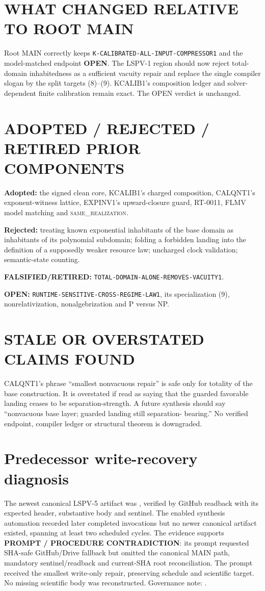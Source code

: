 \documentclass[11pt]{article}
\newcommand{\OPEN}{\textbf{OPEN}}
\newcommand{\same}{\textsc{same\_realization}}
\begin{document}
\section{WHAT CHANGED RELATIVE TO ROOT MAIN}
Root MAIN correctly keeps \texttt{K-CALIBRATED-ALL-INPUT-COMPRESSOR1} and
the model-matched endpoint \OPEN.  The LSPV-1 region should now reject
total-domain inhabitedness as a sufficient vacuity repair and replace the
single compiler slogan by the split targets (8)--(9).  KCALIB1's composition
ledger and solver-dependent finite calibration remain exact.  The OPEN
verdict is unchanged.

\section{ADOPTED / REJECTED / RETIRED PRIOR COMPONENTS}
\textbf{Adopted:} the signed clean core, KCALIB1's charged composition,
CALQNT1's exponent-witness lattice, EXPINV1's upward-closure guard, RT-0011,
FLMV model matching and \same{}.

\textbf{Rejected:} treating known exponential inhabitants of the base domain
as inhabitants of its polynomial subdomain; folding a forbidden landing into
the definition of a supposedly weaker resource law; uncharged clock
validation; semantic-state counting.

\textbf{FALSIFIED/RETIRED:}
\texttt{TOTAL-DOMAIN-ALONE-REMOVES-VACUITY1}.

\textbf{OPEN:} \texttt{RUNTIME-SENSITIVE-CROSS-REGIME-LAW1}, its
specialization (9), nonrelativization, nonalgebrization and P versus NP.

\section{STALE OR OVERSTATED CLAIMS FOUND}
CALQNT1's phrase ``smallest nonvacuous repair'' is safe only for totality of
the base construction.  It is overstated if read as saying that the guarded
favorable landing ceases to be separation-strength.  A future synthesis
should say ``nonvacuous base layer; guarded landing still separation-
bearing.''  No verified endpoint, compiler ledger or structural theorem is
downgraded.

\section{Predecessor write-recovery diagnosis}
The newest canonical LSPV-5 artifact was
, verified by
GitHub readback with its expected header, substantive body and sentinel.
The enabled synthesis automation recorded later completed invocations but no
newer canonical artifact existed, spanning at least two scheduled cycles.
The evidence supports \textbf{PROMPT / PROCEDURE CONTRADICTION}: its prompt
requested SHA-safe GitHub/Drive fallback but omitted the canonical MAIN path,
mandatory sentinel/readback and current-SHA root reconciliation.  The prompt
received the smallest write-only repair, preserving schedule and scientific
target.  No missing scientific body was reconstructed.  Governance note:
.
\end{document}

